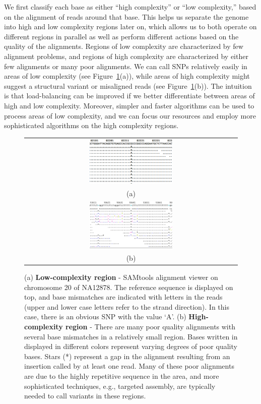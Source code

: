 \documentclass[10pt]{article}
\begin{document}
We first classify each base as either ``high complexity'' or ``low complexity,'' based on the alignment of reads around that base.
This helps us separate the genome into high and low complexity regions later on, which allows us to both operate on different regions in parallel as well as perform different actions based on the quality of the alignments.
Regions of low complexity are characterized by few alignment problems, and regions of high complexity are characterized by either few alignments or many poor alignments.
We can call SNPs relatively easily in
areas of low complexity (see Figure~\ref{low-complexity}(a)), while areas of
high complexity might suggest a structural variant or misaligned reads (see Figure~\ref{low-complexity}(b)).
The intuition is that load-balancing can be improved if we better differentiate between areas of high and low complexity.
Moreover, simpler and faster algorithms can be used to process areas of low complexity, and we can focus our resources and employ more sophisticated algorithms on the high complexity regions.

\begin{figure}[h!]
\begin{center}
\begin{tabular} {@{}c@{}}
  \includegraphics[width=0.40\textwidth]{figs/snp.png} \\ %
   (a) \\
  \includegraphics[width=0.40\textwidth]{figs/high-weirdness.png} \\
   (b) \\
\end{tabular}
\end{center}
\caption{(a) \textbf{Low-complexity region} - SAMtools alignment viewer on chromosome 20 of NA12878.
The reference sequence is displayed on top, and base mismatches are indicated with letters in the reads (upper and lower case letters refer to the strand direction).
In this case, there is an obvious SNP with the value `A'.
(b) \textbf{High-complexity region} - There are many poor quality alignments with several base mismatches in a relatively small region.
Bases written in displayed in different colors represent varying degrees of poor quality bases.
Stars (*) represent a gap in the alignment resulting from an insertion called by at least one read.
Many of these poor alignments are due to the highly repetitive sequence in the area, and more sophisticated techniques, e.g., targeted assembly, are typically needed to call variants in these regions.  }
  \label{low-complexity}
\end{figure}
\end{document}
